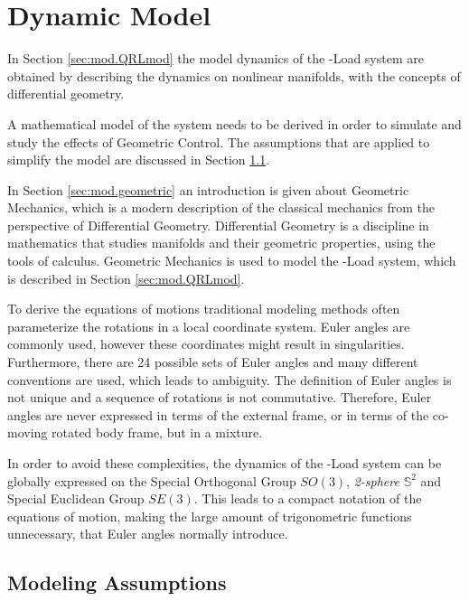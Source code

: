 \chapter{Dynamic Model} \label{ch:model}

In Section \ref{sec:mod.QRLmod} the model dynamics of the -Load system are obtained by describing the dynamics on nonlinear manifolds, with the concepts of differential geometry. 


A mathematical model of the system needs to be derived in order to simulate and study the effects of Geometric Control. 
The assumptions that are applied to simplify the model are discussed in Section \ref{sec:mod.assum}.

In Section \ref{sec:mod.geometric} an introduction is given about Geometric Mechanics, which is a modern description of the classical mechanics from the perspective of Differential Geometry. Differential Geometry is a discipline in mathematics that studies manifolds and their geometric properties, using the tools of calculus. Geometric Mechanics is used to model the -Load system, which is described in Section \ref{sec:mod.QRLmod}.

To derive the equations of motions traditional modeling methods often parameterize the rotations in a local coordinate system. Euler angles are commonly used, however these coordinates might result in singularities. Furthermore, there are 24 possible sets of Euler angles and many different conventions are used, which leads to ambiguity. The definition of Euler angles is not unique and a sequence of rotations is not commutative. Therefore, Euler angles are never expressed in terms of the external frame, or in terms of the co-moving rotated body frame, but in a mixture.

In order to avoid these complexities, the dynamics of the -Load system can be globally expressed on the Special Orthogonal Group $SO(3)$, \textit{2-sphere} $ \mathbb{S}^2 $ and Special Euclidean Group $ SE(3) $. This leads to a compact notation of the equations of motion, making the large amount of trigonometric functions unnecessary, that Euler angles normally introduce. 

\section{Modeling Assumptions}\label{sec:mod.assum} 


